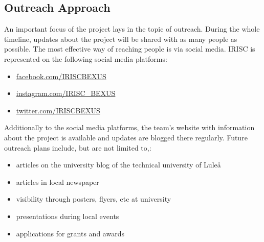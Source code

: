 
\subsection{Outreach Approach}
An important focus of the project lays in the topic of outreach. During the whole timeline, updates about the project will be shared with as many people as possible. The most effective way of reaching people is via social media. IRISC is represented on the following social media platforms:
\begin{itemize}
	\item \url{facebook.com/IRISCBEXUS}
	\item \url{instagram.com/IRISC_BEXUS}
	\item \url{twitter.com/IRISCBEXUS}
\end{itemize}
Additionally to the social media platforms, the team's website with information about the project is available and updates are blogged there regularly.\newline\newline
Future outreach plans include, but are not limited to,:
\begin{itemize}
	\item articles on the university blog of the technical university of Lule\aa
	\item articles in local newspaper
	\item visibility through posters, flyers, etc at university
	\item presentations during local events
	\item applications for grants and awards
\end{itemize}

